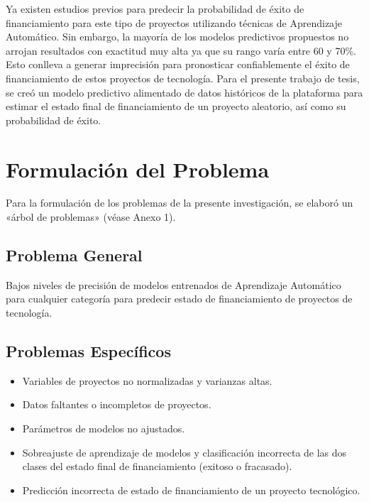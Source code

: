 Ya existen estudios previos para predecir la probabilidad de éxito de financiamiento para este tipo de proyectos utilizando técnicas de Aprendizaje Automático. Sin embargo, la mayoría de los modelos predictivos propuestos no arrojan resultados con exactitud muy alta ya que su rango varía entre 60 y 70\%. Esto conlleva a generar imprecisión para pronosticar confiablemente el éxito de financiamiento de estos proyectos de tecnología. Para el presente trabajo de tesis, se creó un modelo predictivo alimentado de datos históricos de la plataforma para estimar el estado final de financiamiento de un proyecto aleatorio, así como su probabilidad de éxito. 



\section{Formulación del Problema}
Para la formulación de los problemas de la presente investigación, se elaboró un «árbol de problemas» (véase Anexo 1).

\subsection{Problema General}
\newcommand{\ProblemaGeneral}{
Bajos niveles de precisión de modelos entrenados de Aprendizaje Automático para cualquier categoría para predecir estado de financiamiento de proyectos de tecnología. 
}
\ProblemaGeneral
\subsection{Problemas Espec\'{i}ficos}
\newcommand{\Pbone}{
Variables de proyectos no normalizadas y varianzas altas.
}
\newcommand{\Pbtwo}{
Datos faltantes o incompletos de proyectos.
}
\newcommand{\Pbthree}{
Parámetros de modelos no ajustados.
}
\newcommand{\Pbfour}{
Sobreajuste de aprendizaje de modelos y clasificación incorrecta de las dos clases del estado final de financiamiento (exitoso o fracasado).
}
\newcommand{\Pbfive}{
Predicción incorrecta de estado de financiamiento de un proyecto tecnológico.
}

\begin{itemize}
	\item \Pbone
	\item \Pbtwo
	\item \Pbthree
	\item \Pbfour
	\item \Pbfive
\end{itemize}

